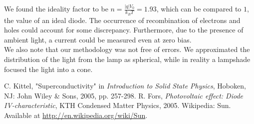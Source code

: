 \documentclass[12pt,a4paper]{article}
\begin{document}
We found the ideality factor to be $n = \frac{|q|V_0}{k_BT} = 1.93$, which can be compared to $1$, the value of an ideal diode. The occurrence of recombination of electrons and holes could account for some discrepancy. Furthermore, due to the presence of ambient light, a current could be measured even at zero bias. \\

We also note that our methodology was not free of errors. We approximated the distribution of the light from the lamp as spherical, while in reality a lampshade focused the light into a cone.

\begin{thebibliography}{9}
 C. Kittel, "Superconductivity" in \emph{Introduction to Solid State Physics}, Hoboken, NJ: John Wiley \& Sons, 2005, pp. 257-298.
 R. Fors, \emph{Photovoltaic effect: Diode IV-characteristic}, KTH Condensed Matter Physics, 2005.
 Wikipedia: Sun. Available at \url{http://en.wikipedia.org/wiki/Sun}.
\end{thebibliography}
\end{document}
